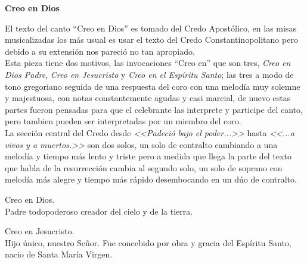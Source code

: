\documentclass[12pt, letterpaper]{report}
\begin{document}


    
    \begin{center}
        \Huge {\bfseries Creo en Dios}
    \end{center}

    \Large El texto del canto ``Creo en Dios'' es tomado del Credo Apost\'olico, en las misas musicalizadas los m\'as usual es usar el texto del Credo Constantinopolitano pero debido a su extensi\'on nos pareci\'o no tan apropiado.\\
    Esta pieza tiene dos motivos, las invocaciones ``Creo en'' que son tres, \textit{Creo en Dios Padre}, \textit{Creo en Jesucristo} y \textit{Creo en el Esp\'iritu Santo}; las tres a modo de tono gregoriano seguida de una respuesta del coro con una melod\'ia muy solemne y majestuosa, con notas constantemente agudas y casi marcial, de nuevo estas partes fueron pensadas para que el celebrante las interprete y participe del canto, pero tambien pueden ser interpretadas por un miembro del coro.\\ La secci\'on central del Credo desde \textit{<<Padeci\'o bajo el poder...>>} hasta \textit{<<...a vivos y a muertos.>>} son dos solos, un solo de contralto cambiando a una melod\'ia y tiempo m\'as lento y triste pero a medida que llega la parte del texto que habla de la resurrecci\'on cambia al segundo solo, un solo de soprano con melod\'ia m\'as alegre y tiempo m\'as r\'apido desembocando en un d\'uo de contralto.
    
    \noindent
    \LARGE Creo en Dios.\\
    Padre todopoderoso creador del cielo y de la tierra.

    \noindent
    Creo en Jesucristo. \\
    Hijo \'unico, nuestro Se\~nor. Fue concebido por obra y gracia del Esp\'iritu Santo, nacio de Santa Mar\'ia Virgen.
\end{document}
